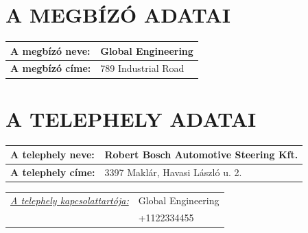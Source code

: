\documentclass[a4paper,12pt]{article}
\renewcommand{\arraystretch}{0.5}
\begin{document}
	
	\section{A MEGBÍZÓ ADATAI}
		\begin{adjustwidth}{1cm}{0cm}
			
			\vspace{0.5em} %
			
			\noindent
			\renewcommand{\arraystretch}{1.4} %
			
			\begin{tabularx}{\textwidth}{ | p{4.5cm} | X | } %
				\hline
				\textbf{A megbízó neve:} & \textbf{Global Engineering} \\ \hline
				\textbf{A megbízó címe:} & 789 Industrial Road \\ \hline
			\end{tabularx}
			
		\end{adjustwidth}
		
	\section{A TELEPHELY ADATAI}
		\begin{adjustwidth}{1cm}{0cm}
			\vspace{0.5em} %
			
			\noindent
			\renewcommand{\arraystretch}{1.4} %
			
			
			\begin{tabularx}{\textwidth}{ | p{4.5cm} | X | } %
				\hline
				\textbf{A telephely neve:} & \textbf{Robert Bosch Automotive Steering Kft.} \\ \hline
				\textbf{A telephely címe:} & 3397 Maklár, Havasi László u. 2. \\ \hline
			\end{tabularx}
			
			\vspace{0.5em} %
			
			\begin{tabular}{ p{5.5cm} p{8cm} } 
				\textit{\underline{A telephely kapcsolattartója:}} & Global Engineering \\  & +1122334455
			\end{tabular}
			
		\end{adjustwidth}
	
\end{document}
